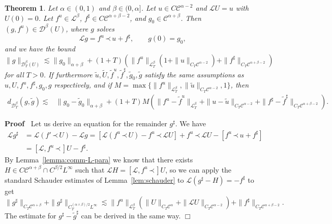 \documentclass[a4paper,11pt]{article}
\newenvironment{proof}{\noindent\textbf{Proof\ }}{\hspace*{\fill}$\Box$\medskip}
\newtheorem{theorem}{Theorem}
\newcommand{\LL}{\mathscr{L}}
\newcommand{\CC}{\mathscr{C}}
\newcommand{\CD}{\mathscr{D}}
\newcommand{\DD}{\mathscr{D}}
\newcommand{\lpara}{\,\mathord{\prec}\,}
\begin{document}
\begin{theorem}
  \label{thm:schauder paracontrolled}Let $\alpha \in (0, 1)$ and $\beta \in
  (0, \alpha]$. Let $u \in C \CC^{\alpha - 2}$ and $\LL U = u$ with $U (0) =
  0$. Let $f^u \in \LL^{\beta}$, $f^{\sharp} \in C \CC^{\alpha + \beta - 2}$,
  and $g_0 \in \CC^{\alpha + \beta}$. Then $(g, f^u) \in \CD^{\beta} (U)$,
  where $g$ solves
  \[ \LL g = f^u \lpara u + f^{\sharp}, \hspace{2em} g (0) = g_0, \]
  and we have the bound
  \[ \| g \|_{\CD^{\beta}_T (U)} \lesssim \| g_0 \|_{\alpha + \beta} + (1 + T)
     (\| f^u \|_{\LL^{\beta}_T} (1 + \| u \|_{C_T \CC^{\alpha - 2}}) + \|
     f^{\sharp} \|_{C_T \CC^{\alpha + \beta - 2}}) \]
  for all $T > 0$. If furthermore $\tilde{u}, \tilde{U}, \tilde{f}^u,
  \tilde{f}^{\sharp}, \tilde{g}_0, \tilde{g}$ satisfy the same assumptions as
  $u, U, f^u, f^{\sharp}, g_0, g$ respectively, and if $M = \max \{ \| f^u
  \|_{\LL^{\beta}_T}, \| \tilde{u} \|_{C_T \CC^{\alpha - 2}}, 1\}$, then
  \begin{eqnarray*}
    d_{\DD^{\beta}_T} (g, \tilde{g}) \lesssim & \| g_0 - \tilde{g}_0
    \|_{\alpha + \beta} 
     + (1 + T) M (\|f^u - \tilde{f}^u \|_{\LL^{\beta}_T} +\|u - \tilde{u}
    \|_{C_T \CC^{\alpha - 2}} +\|f^{\sharp} - \tilde{f}^{\sharp} \|_{C_T
    \CC^{\alpha + \beta - 2}}) . & 
  \end{eqnarray*}
\end{theorem}

\begin{proof}
  Let us derive an equation for the remainder $g^{\sharp}$. We have
  \begin{align*}
    \LL g^{\sharp} & = \LL (f' \lpara U) - \LL g = \left[ \LL (f^u \lpara U) - f^u \lpara \LL U \right] + f^u \lpara \LL U - [f^u \lpara u + f^{\sharp}] \\
    & = \left[ \LL, f^u \lpara \right] U - f^{\sharp} .
  \end{align*}
  By Lemma~\ref{lemma:comm-L-para} we know that there exists $H \in C
  \CC^{\alpha + \beta} \cap C^{\beta / 2} L^{\infty}$ such that $\LL H =
  \left[ \LL, f^u \lpara \right] U$, so we can apply the standard Schauder
  estimates of Lemma~\ref{lem:schauder} to $\LL (g^{\sharp} - H) = -
  f^{\sharp}$ to get
  \[ \| g^{\sharp} \|_{C_T \CC^{\alpha + \beta}} + \| g^{\sharp}
     \|_{C_T^{(\alpha \wedge \beta) / 2} L^{\infty}} \lesssim \| f^u
     \|_{\LL^{\beta}_T} ( \| U \|_{C_T \CC^{\alpha}} + \| \LL U
     \|_{C_T \CC^{\alpha - 2}} ) + \| f^{\sharp} \|_{C_T
     \CC^{\alpha + \beta - 2}} . \]
  The estimate for $g^{\sharp} - \tilde{g}^{\sharp}$ can be derived in the
  same way.
\end{proof}
\end{document}
